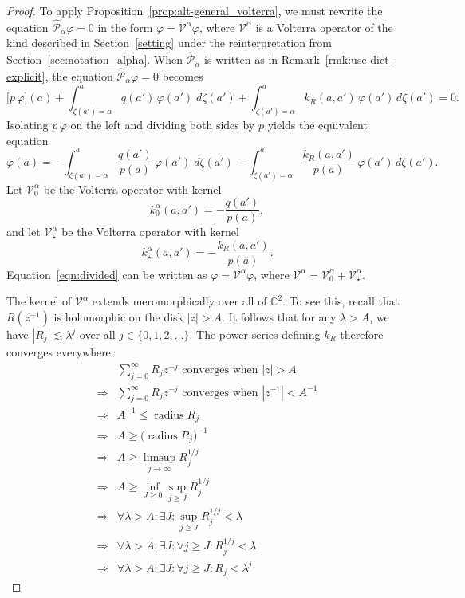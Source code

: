 \documentclass{article}
\theoremstyle{definition}
\theoremstyle{plain}
\newcommand{\C}{\mathbb{C}}
\newcommand{\volterra}{\mathcal{V}}
\newcommand{\hardpart}{\mathcal{V}_0}
\newcommand{\softpart}{\mathcal{V}_\star}
\newcommand{\hardker}{k_0}
\newcommand{\softker}{k_\star}
\newenvironment{verify}{\color{veriforest}}{\color{black}}
\newenvironment{revtwo}{\color{revred}}{\color{black}}
\newenvironment{revtwo}{}{}
\begin{document}
\begin{proof}
To apply Proposition~\ref{prop:alt-general_volterra}, we must rewrite the equation $\hat{\mathcal{P}}_{\alpha}\varphi = 0$ in the form $\varphi = \volterra^\alpha \varphi$, where $\volterra^\alpha$ is a Volterra operator of the kind described in Section~\ref{setting} under the reinterpretation from Section~\ref{sec:notation_alpha}. When $\hat{\mathcal{P}}_\alpha$ is written as in Remark~\ref{rmk:use-dict-explicit}, the equation $\hat{\mathcal{P}}_{\alpha} \varphi = 0$ becomes
\begin{revtwo}
\[ \big[ p\, \varphi \big](a) + \int_{\zeta(a')=\alpha}^a q(a') \, \varphi(a') \; d\zeta(a') + \int_{\zeta(a')=\alpha}^a k_R(a, a') \, \varphi(a') \, d\zeta(a') = 0. \]
\end{revtwo}
Isolating $p\,\varphi$ on the left and dividing both sides by $p$ yields the equivalent equation
\begin{revtwo}
\begin{equation}\label{eqn:divided}
\varphi(a) = -\int_{\zeta(a')=\alpha}^a \frac{q(a')}{p(a)} \, \varphi(a') \; d\zeta(a') - \int_{\zeta(a')=\alpha}^a \frac{k_R(a, a')}{p(a)} \, \varphi(a') \, d\zeta(a').
\end{equation}
\end{revtwo}
Let $\hardpart^\alpha$ be the Volterra operator with kernel
\[ \hardker^\alpha(a,a') = -\frac{q(a')}{p(a)}, \]
and let $\softpart^\alpha$ be the Volterra operator with kernel
\[ \softker^\alpha(a,a') = -\frac{k_R(a,a')}{p(a)}. \]
Equation~\eqref{eqn:divided} can be written as $\varphi = \volterra^\alpha \varphi$, where $\volterra^\alpha = \hardpart^\alpha + \softpart^\alpha$.

The kernel of $\volterra^\alpha$ extends meromorphically over all of $\C^2$. To see this, recall that $R(z^{-1})$ is holomorphic on the disk $|z| > A$. It follows that for any $\lambda > A$, we have $|R_j| \lesssim \lambda^j$ over all $j \in \{0, 1, 2, \ldots\}$. The power series defining $k_R$ therefore converges everywhere.
\begin{verify}
\begin{align*}
& \sum_{j = 0}^\infty R_j z^{-j} \text{ converges when } |z| > A \\
\Longrightarrow & \sum_{j = 0}^\infty R_j z^{-j} \text{ converges when } |z^{-1}| < A^{-1} \\
\Longrightarrow & A^{-1} \le \operatorname{radius} R_j \\
\Longrightarrow & A \ge \big(\operatorname{radius} R_j\big)^{-1} \\
\Longrightarrow & A \ge \limsup_{j \to \infty} R_j^{1/j} \\
\Longrightarrow & A \ge \inf_{J \ge 0} \sup_{j \ge J} R_j^{1/j} \\
\Longrightarrow & \forall \lambda > A: \exists J: \sup_{j \ge J} R_j^{1/j} < \lambda \\
\Longrightarrow & \forall \lambda > A: \exists J: \forall j \ge J: R_j^{1/j} < \lambda \\
\Longrightarrow & \forall \lambda > A: \exists J: \forall j \ge J: R_j < \lambda^j
\end{align*}
\end{verify}


\end{proof}
\end{document}
